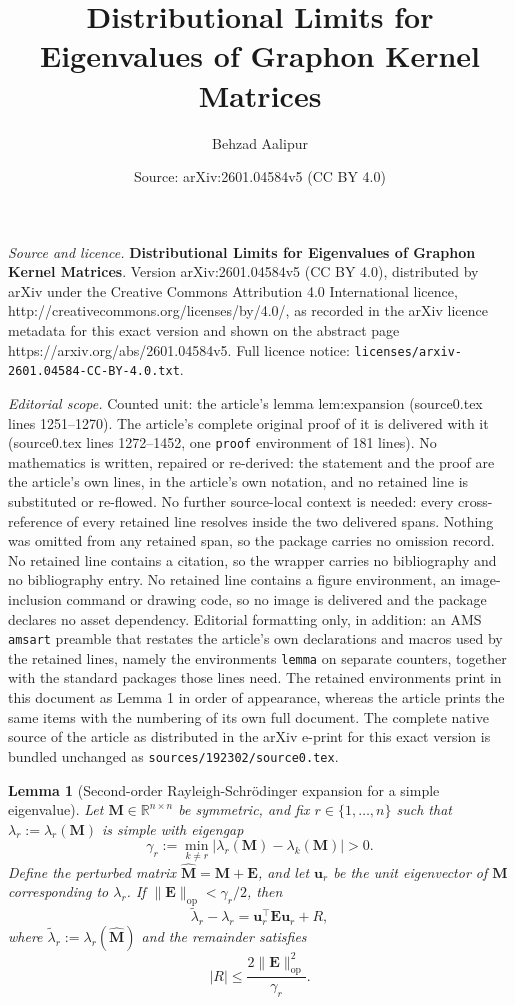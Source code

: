 \documentclass[10pt,a4paper]{amsart}
\title{\textbf{Distributional Limits for Eigenvalues of Graphon Kernel Matrices}}
\author{Behzad Aalipur}
\date{Source: arXiv:2601.04584v5 (CC BY 4.0)}
\newtheorem{lemma}{Lemma}
\newcommand{\op}{\mathrm{op}}
\begin{document}
\maketitle

\noindent\emph{Source and licence.} \textbf{Distributional Limits for Eigenvalues of Graphon Kernel Matrices}. Version arXiv:2601.04584v5 (CC BY 4.0), distributed by arXiv under the Creative Commons Attribution 4.0 International licence, http://creativecommons.org/licenses/by/4.0/, as recorded in the arXiv licence metadata for this exact version and shown on the abstract page https://arxiv.org/abs/2601.04584v5. Full licence notice: \texttt{licenses/arxiv-2601.04584-CC-BY-4.0.txt}.\par\smallskip

\noindent\textit{Editorial scope.} Counted unit: the article's lemma lem:expansion (source0.tex lines 1251--1270). The article's complete original proof of it is delivered with it (source0.tex lines 1272--1452, one \texttt{proof} environment of 181 lines). No mathematics is written, repaired or re-derived: the statement and the proof are the article's own lines, in the article's own notation, and no retained line is substituted or re-flowed.  No further source-local context is needed: every cross-reference of every retained line resolves inside the two delivered spans.  Nothing was omitted from any retained span, so the package carries no omission record.  No retained line contains a citation, so the wrapper carries no bibliography and no bibliography entry.  No retained line contains a figure environment, an image-inclusion command or drawing code, so no image is delivered and the package declares no asset dependency.  Editorial formatting only, in addition: an AMS \texttt{amsart} preamble that restates the article's own declarations and macros used by the retained lines, namely the environments \texttt{lemma} on separate counters, together with the standard packages those lines need.  The retained environments print in this document as Lemma 1 in order of appearance, whereas the article prints the same items with the numbering of its own full document.  The complete native source of the article as distributed in the arXiv e-print for this exact version is bundled unchanged as \texttt{sources/192302/source0.tex}.
\begin{lemma}[Second-order Rayleigh-Schrödinger expansion for a simple eigenvalue]
\label{lem:expansion}
Let $\mathbf{M} \in \mathbb{R}^{n \times n}$ be symmetric, and fix $r \in \{1,\dots,n\}$ such that 
$\lambda_r := \lambda_r(\mathbf{M})$ is simple with eigengap
\[
\gamma_r := \min_{k \neq r}|\lambda_r(\mathbf{M}) - \lambda_k(\mathbf{M})| > 0.
\]
Define the perturbed matrix $\widehat{\mathbf{M}} = \mathbf{M} + \mathbf{E}$, and let $\mathbf{u}_r$
be the unit eigenvector of $\mathbf{M}$ corresponding to $\lambda_r$.
If $\|\mathbf{E}\|_{\op} < \gamma_r/2$, then
\[
\widetilde{\lambda}_r - \lambda_r
=
\mathbf{u}_r^\top \mathbf{E}\mathbf{u}_r + R,
\]
where $\widetilde{\lambda}_r := \lambda_r(\widehat{\mathbf{M}})$ and the remainder satisfies
\[
|R| \le \frac{2\|\mathbf{E}\|_{\op}^2}{\gamma_r}.
\]
\end{lemma}
\end{document}

